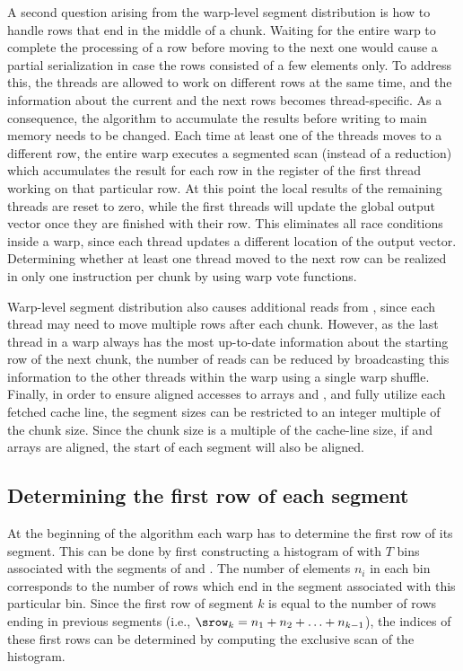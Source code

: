 A second question arising from the warp-level segment distribution is
how to handle rows that end in the middle of a chunk.
Waiting for the entire warp to complete the processing of a row
before moving to the next one
would cause a partial serialization
in case the rows consisted of a few elements only.
To address this, the threads are allowed to work
on different rows at the same time,
and the information about the current and the next rows
becomes thread-specific.
As a consequence, the algorithm to accumulate the results
before writing to main memory needs to be changed.
Each time at least one of the threads moves to a different row,
the entire warp executes a segmented scan (instead of a reduction)
which accumulates the result for each row
in the register of the first thread working on that particular row.
At this point the local results of the remaining threads are reset to zero,
while the first threads will update the global output vector
once they are finished with their row.
This eliminates all race conditions inside a warp,
since each thread updates a different location of the output vector.
Determining whether at least one thread moved to the next row can be
realized in only one instruction per chunk by using warp vote functions.

Warp-level segment distribution also causes
additional reads from \rowptr,
since each thread may need to move multiple rows after each chunk.
However, as the last thread in a warp
always has the most up-to-date information
about the starting row of the next chunk,
the number of reads can be reduced
by broadcasting this information to the other threads within the warp
using a single warp shuffle.
Finally, in order to ensure aligned accesses to arrays \val and \colidx,
and fully utilize each fetched cache line,
the segment sizes can be restricted to an integer multiple of the chunk size.
Since the chunk size is a multiple of the cache-line size,
if \val and \colidx arrays are aligned,
the start of each segment will also be aligned.

\subsection{Determining the first row of each segment}

At the beginning of the \bcsr algorithm each warp has to determine
the first row of its segment.
This can be done by first constructing a histogram of \rowptr
with $T$ bins associated with the segments of \val and \colidx.
The number of elements $n_i$ in each bin corresponds to the number of rows
which end in the segment associated with this particular bin.
Since the first row of segment $k$
is equal to the number of rows ending in previous segments
(i.e., $\srow_k = n_1 + n_2 + \ldots + n_{k-1}$),
the indices of these first rows can be determined by computing the exclusive scan
of the histogram.

